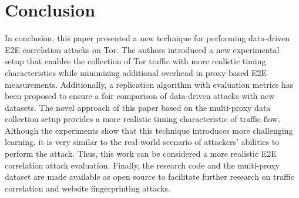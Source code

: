 \documentclass[sigconf]{acmart}
\begin{document}
\vspace{-3mm}

\section{Conclusion} \label{9}


In conclusion, this paper presented a new technique for performing data-driven E2E correlation attacks on Tor. The authors introduced a new experimental setup that enables the collection of Tor traffic with more realistic timing characteristics while minimizing additional overhead in proxy-based E2E measurements. Additionally, a replication algorithm with evaluation metrics has been proposed to ensure a fair comparison of data-driven attacks with new datasets. The novel approach of this paper based on the multi-proxy data collection setup provides a more realistic timing characteristic of traffic flow. Although the experiments show that this technique introduces more challenging learning, it is very similar to the real-world scenario of attackers' abilities to perform the attack. Thus, this work can be considered a more realistic E2E correlation attack evaluation. Finally, the research code and the multi-proxy dataset are made available as open source to facilitate further research on traffic correlation and website fingerprinting attacks.



\vspace{5mm}
\\~\\








\end{document}
